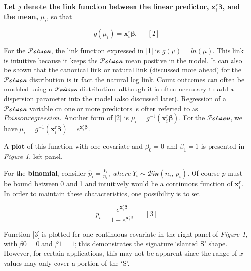 \documentclass[
  9pt,
  ignorenonframetext,
]{beamer}
\begin{document}
\begin{frame}{}
\protect\hypertarget{section}{}
\textbf{Let \(g\) denote the link function between the linear predictor,
\(\pmb x_i^r \pmb \beta\), and the mean, \(\mu_i\)}, so that

\[g(\mu_i)=\pmb x_i^r \pmb \beta. \ \ \ \ \ \ \ [2]\]

For the \(\mathcal {Poisson}\), the link function expressed in {[}1{]}
is \(g(\mu) = ln(\mu)\). This link is intuitive because it keeps the
\(\mathcal {Poisson}\) mean positive in the model. It can also be shown
that the canonical link or natural link (discussed more ahead) for the
\(\mathcal {Poisson}\) distribution is in fact the natural log link.
Count outcomes can often be modeled using a \(\mathcal {Poisson}\)
distribution, although it is often necessary to add a dispersion
parameter into the model (also discussed later). Regression of a
\(\mathcal {Poisson}\) variable on one or more predictors is often
referred to as \(Poisson regression\). Another form of {[}2{]} is
\(\mu_i=g^{-1} (\pmb x_i^r \pmb \beta)\). For the
\(\mathcal {Poisson}\), we have
\(\mu_i=g^{-1} (\pmb x_i^r \pmb \beta)=e^{\pmb x_i^r \pmb \beta}\).

A \textbf{plot} of this function with one covariate and \(\beta_0=0\)
and \(\beta_1=1\) is presented in \emph{Figure 1}, left panel.
\end{frame}

\begin{frame}{}
\protect\hypertarget{section-1}{}
For the \textbf{binomial}, consider
\(\hat p_i= \frac {Y_i} {n_i},\ where\ Y_i \sim \mathcal {Bin} (n_i,\ p_i )\).
Of course \(p\) must be bound between 0 and 1 and intuitively would be a
continuous function of \(\pmb x_i^r\). In order to maintain these
characteristics, one possibility is to set

\[p_i=\frac {e^{\pmb x_i^r \pmb \beta}} {1+e^{\pmb x_i^r \pmb \beta} }. \ \ \ \ \ \ [3]\]

Function {[}3{]} is plotted for one continuous covariate in the right
panel of \emph{Figure 1}, with \(\beta0 = 0\) and \(\beta1=1\); this
demonstrates the signature `slanted S' shape. However, for certain
applications, this may not be apparent since the range of \(x\) values
may only cover a portion of the `S'.
\end{frame}
\end{document}
